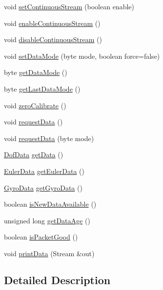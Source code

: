 \begin{DoxyCompactItemize}
void \hyperlink{class_dof_handler_a3199e9a17ddf0b72e9ccba09edab35f6}{set\-Continuous\-Stream} (boolean enable)
\item 
void \hyperlink{class_dof_handler_a970a320038d5bdb8104a53d1feb36f8b}{enable\-Continuous\-Stream} ()
\item 
void \hyperlink{class_dof_handler_a70b21e08313858e817b740f296a03b16}{disable\-Continuous\-Stream} ()
\item 
void \hyperlink{class_dof_handler_a0605316058671f9ba24b9c6545838db7}{set\-Data\-Mode} (byte mode, boolean force=false)
\item 
byte \hyperlink{class_dof_handler_a8b2586f156c9680470df68cae887dac1}{get\-Data\-Mode} ()
\item 
byte \hyperlink{class_dof_handler_ab74bb039aa162e2157a04bfa8a0f3f9c}{get\-Last\-Data\-Mode} ()
\item 
void \hyperlink{class_dof_handler_a52a66b70ad180c37132216e57575f26b}{zero\-Calibrate} ()
\item 
void \hyperlink{class_dof_handler_a5a435a4e5e7c715487fab1c3a60321ed}{request\-Data} ()
\item 
void \hyperlink{class_dof_handler_aaa9ca10549f8af89e497e6650debc7b0}{request\-Data} (byte mode)
\item 
\hyperlink{struct_dof_data}{Dof\-Data} \hyperlink{class_dof_handler_a2b8d4b44169accf7ea8abb0c535aa365}{get\-Data} ()
\item 
\hyperlink{struct_euler_data}{Euler\-Data} \hyperlink{class_dof_handler_aca0c47b133333c5385ecf7d094d7a8ab}{get\-Euler\-Data} ()
\item 
\hyperlink{struct_gyro_data}{Gyro\-Data} \hyperlink{class_dof_handler_a5245e4a1b3dd0f70da07554b52c62662}{get\-Gyro\-Data} ()
\item 
boolean \hyperlink{class_dof_handler_aba34225832d2af726f00df12e4d7b5f9}{is\-New\-Data\-Available} ()
\item 
unsigned long \hyperlink{class_dof_handler_a1ac23ca83a1b30c2535f0a920b35bd9b}{get\-Data\-Age} ()
\item 
boolean \hyperlink{class_dof_handler_a2d3a82910a5eeb96ef07b4ca80f91299}{is\-Packet\-Good} ()
\item 
void \hyperlink{class_dof_handler_a9e25cdcecda1c6480e4b122044e69258}{print\-Data} (Stream \&out)
\end{DoxyCompactItemize}


\subsection{Detailed Description}
